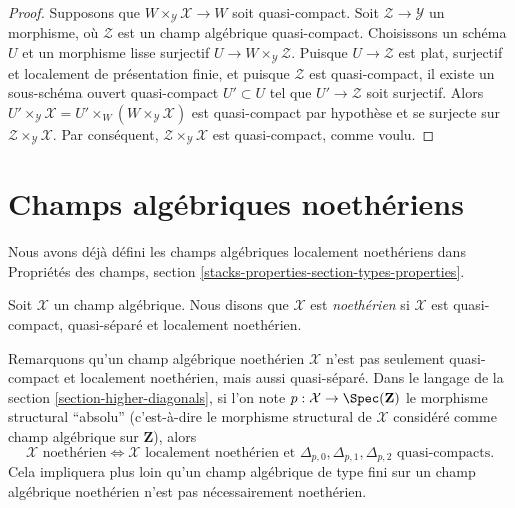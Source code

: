 \begin{proof}
Supposons que $W \times_\mathcal{Y} \mathcal{X} \to W$ soit quasi-compact.
Soit $\mathcal{Z} \to \mathcal{Y}$ un morphisme, où $\mathcal{Z}$ est un
champ algébrique quasi-compact. Choisissons un schéma $U$ et un morphisme
lisse surjectif $U \to W \times_\mathcal{Y} \mathcal{Z}$. Puisque
$U \to \mathcal{Z}$ est plat, surjectif et localement de présentation finie,
et puisque $\mathcal{Z}$ est quasi-compact, il existe un sous-schéma ouvert
quasi-compact $U' \subset U$ tel que $U' \to \mathcal{Z}$ soit surjectif.
Alors
$U' \times_\mathcal{Y} \mathcal{X} =
U' \times_W (W \times_\mathcal{Y} \mathcal{X})$
est quasi-compact par hypothèse et se surjecte sur
$\mathcal{Z} \times_\mathcal{Y} \mathcal{X}$. Par conséquent,
$\mathcal{Z} \times_\mathcal{Y} \mathcal{X}$ est quasi-compact, comme voulu.
\end{proof}











\section{Champs algébriques noethériens}
\label{section-noetherian}

\noindent
Nous avons déjà défini les champs algébriques localement noethériens dans
Propriétés des champs, section
\ref{stacks-properties-section-types-properties}.

\begin{definition}
\label{definition-noetherian}
Soit $\mathcal{X}$ un champ algébrique. Nous disons que $\mathcal{X}$ est
{\it noethérien} si $\mathcal{X}$ est quasi-compact, quasi-séparé et
localement noethérien.
\end{definition}

\noindent
Remarquons qu'un champ algébrique noethérien $\mathcal{X}$ n'est pas seulement
quasi-compact et localement noethérien, mais aussi quasi-séparé. Dans le
langage de la section \ref{section-higher-diagonals}, si l'on note
$p : \mathcal{X} \to \Spec(\mathbf{Z})$ le morphisme structural
``absolu'' (c'est-à-dire le morphisme structural de $\mathcal{X}$ considéré
comme champ algébrique sur $\mathbf{Z}$), alors
$$
\mathcal{X}\text{ noethérien}
\Leftrightarrow
\mathcal{X}\text{ localement noethérien et }
\Delta_{p, 0}, \Delta_{p, 1}, \Delta_{p, 2}
\text{ quasi-compacts}.
$$
Cela impliquera plus loin qu'un champ algébrique de type fini sur un champ
algébrique noethérien n'est pas nécessairement noethérien.

